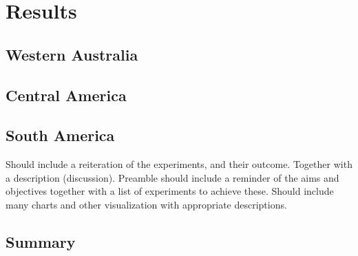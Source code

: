 \chapter{Results}
\label{ch:results}

\section{Western Australia}

\section{Central America}

\section{South America}

Should include a reiteration of the experiments, and their outcome.  Together with a description (discussion).  Preamble should include a reminder of the aims and objectives together with a list of experiments to achieve these.  Should include many charts and other visualization with appropriate descriptions.  

\Blindtext

\section*{Summary}
\blindtext\enlargethispage{\baselineskip} %